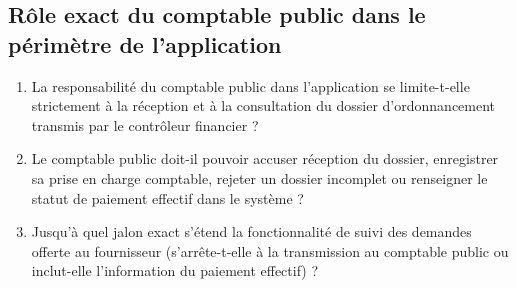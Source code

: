 \subsection{Rôle exact du comptable public dans le périmètre de l'application}

\begin{enumerate}
  \item La responsabilité du comptable public dans l'application se limite-t-elle strictement à la réception et à la consultation du dossier d'ordonnancement transmis par le contrôleur financier ?
  \item Le comptable public doit-il pouvoir accuser réception du dossier, enregistrer sa prise en charge comptable, rejeter un dossier incomplet ou renseigner le statut de paiement effectif dans le système ?
  \item Jusqu'à quel jalon exact s'étend la fonctionnalité de suivi des demandes offerte au fournisseur (s'arrête-t-elle à la transmission au comptable public ou inclut-elle l'information du paiement effectif) ?
\end{enumerate}
